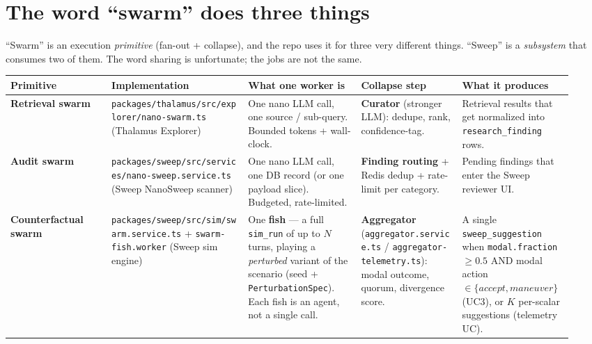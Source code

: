 




\makespecheader

\section{The word ``swarm'' does three things}

``Swarm'' is an execution \emph{primitive} (fan-out + collapse), and the repo uses it for three very different things. ``Sweep'' is a \emph{subsystem} that consumes two of them. The word sharing is unfortunate; the jobs are not the same.

\begin{longtable}{@{}p{0.17\linewidth}p{0.23\linewidth}p{0.19\linewidth}p{0.17\linewidth}p{0.18\linewidth}@{}}
\toprule
\textbf{Primitive} & \textbf{Implementation} & \textbf{What one worker is} & \textbf{Collapse step} & \textbf{What it produces} \\
\midrule
\endhead

\textbf{Retrieval swarm} &
\texttt{packages/thalamus/src/explorer/nano-swarm.ts} (Thalamus Explorer) &
One nano LLM call, one source / sub-query. Bounded tokens + wall-clock. &
\textbf{Curator} (stronger LLM): dedupe, rank, confidence-tag. &
Retrieval results that get normalized into \texttt{research\_finding} rows. \\

\textbf{Audit swarm} &
\texttt{packages/sweep/src/services/nano-sweep.service.ts} (Sweep NanoSweep scanner) &
One nano LLM call, one DB record (or one payload slice). Budgeted, rate-limited. &
\textbf{Finding routing} + Redis dedup + rate-limit per category. &
Pending findings that enter the Sweep reviewer UI. \\

\textbf{Counterfactual swarm} &
\texttt{packages/sweep/src/sim/swarm.service.ts} + \texttt{swarm-fish.worker} (Sweep sim engine) &
One \textbf{fish} --- a full \texttt{sim\_run} of up to $N$ turns, playing a \emph{perturbed} variant of the scenario (seed + \texttt{PerturbationSpec}). Each fish is an agent, not a single call. &
\textbf{Aggregator} (\texttt{aggregator.service.ts} / \texttt{aggregator-telemetry.ts}): modal outcome, quorum, divergence score. &
A single \texttt{sweep\_suggestion} when \texttt{modal.fraction} $\geq 0.5$ AND modal action $\in \{accept, maneuver\}$ (UC3), or $K$ per-scalar suggestions (telemetry UC). \\

\bottomrule
\end{longtable}

